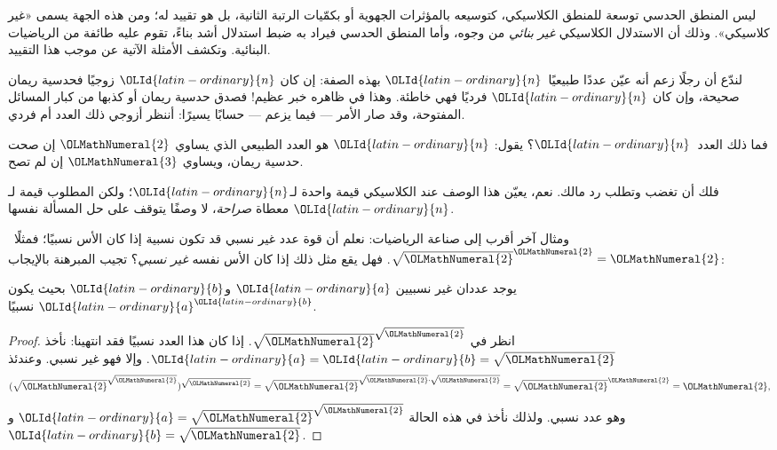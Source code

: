 \documentclass[../../../include/open-logic-section]{subfiles}
\begin{document}


ليس المنطق الحدسي توسعة للمنطق الكلاسيكي، كتوسيعه بالمؤثرات الجهوية أو
بكمّيات الرتبة الثانية، بل هو تقييد له؛ ومن هذه الجهة يسمى «غير كلاسيكي».
وذلك أن الاستدلال الكلاسيكي \emph{غير بنائي} من وجوه، وأما المنطق الحدسي
فيراد به ضبط استدلال أشد بناءً، تقوم عليه طائفة من الرياضيات البنائية.
وتكشف الأمثلة الآتية عن موجب هذا التقييد.

لندّع أن رجلًا زعم أنه عيّن عددًا طبيعيًا~$\OLId{latin-ordinary}{n}$ بهذه الصفة: إن كان $\OLId{latin-ordinary}{n}$
زوجيًا فحدسية ريمان صحيحة، وإن كان $\OLId{latin-ordinary}{n}$ فرديًا فهي خاطئة. وهذا في ظاهره
خبر عظيم!{} فصدق حدسية ريمان أو كذبها من كبار المسائل المفتوحة، وقد صار
الأمر --- فيما يزعم --- حسابًا يسيرًا: أننظر أزوجي ذلك العدد أم فردي.

فما ذلك العدد~$\OLId{latin-ordinary}{n}$؟ يقول: $\OLId{latin-ordinary}{n}$ هو العدد الطبيعي الذي يساوي $\OLMathNumeral{2}$ إن صحت
حدسية ريمان، ويساوي $\OLMathNumeral{3}$ إن لم تصح.

فلك أن تغضب وتطلب رد مالك. نعم، يعيّن هذا الوصف عند الكلاسيكي قيمة واحدة
لـ$\OLId{latin-ordinary}{n}$؛ ولكن المطلوب قيمة لـ$\OLId{latin-ordinary}{n}$ معطاة \emph{صراحة}، لا وصفًا يتوقف على
حل المسألة نفسها.

ومثال آخر أقرب إلى صناعة الرياضيات: نعلم أن قوة عدد غير نسبي قد تكون
نسبية إذا كان الأس نسبيًا؛ فمثلًا~$\sqrt{\OLMathNumeral{2}}^\OLMathNumeral{2} = \OLMathNumeral{2}$. فهل يقع مثل ذلك إذا
كان الأس نفسه \emph{غير نسبي}؟ تجيب المبرهنة بالإيجاب:

\begin{thm}
يوجد عددان غير نسبيين $\OLId{latin-ordinary}{a}$ و$\OLId{latin-ordinary}{b}$ بحيث يكون $\OLId{latin-ordinary}{a}^\OLId{latin-ordinary}{b}$ نسبيًا.
\end{thm}

\begin{proof}
انظر في $\sqrt{\OLMathNumeral{2}}^{\sqrt{\OLMathNumeral{2}}}$. إذا كان هذا العدد نسبيًا فقد انتهينا:
نأخذ $\OLId{latin-ordinary}{a} = \OLId{latin-ordinary}{b} = \sqrt{\OLMathNumeral{2}}$. وإلا فهو غير نسبي. وعندئذ
\[
(\sqrt{\OLMathNumeral{2}}^{\sqrt{\OLMathNumeral{2}}})^{\sqrt{\OLMathNumeral{2}}} = \sqrt{\OLMathNumeral{2}}^{\sqrt{\OLMathNumeral{2}} \cdot
  \sqrt{\OLMathNumeral{2}}} = \sqrt{\OLMathNumeral{2}}^\OLMathNumeral{2} = \OLMathNumeral{2},
\]
وهو عدد نسبي. ولذلك نأخذ في هذه الحالة
$\OLId{latin-ordinary}{a}=\sqrt{\OLMathNumeral{2}}^{\sqrt{\OLMathNumeral{2}}}$ و$\OLId{latin-ordinary}{b}=\sqrt \OLMathNumeral{2}$.
\end{proof}
\end{document}
